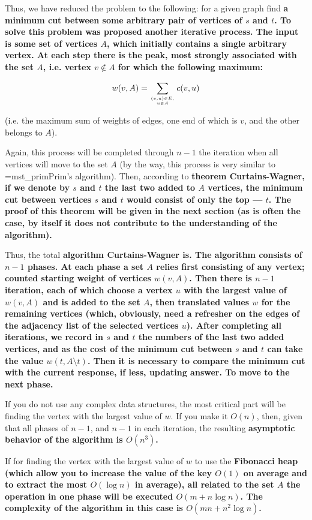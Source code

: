 Thus, we have reduced the problem to the following: for a given graph find \bf{a minimum cut between some arbitrary pair of vertices} of $s$ and $t$. To solve this problem was proposed another iterative process. The input is some set of vertices $A$, which initially contains a single arbitrary vertex. At each step there is the peak, \bf{most strongly associated} with the set $A$, i.e. vertex $v \not\in A$ for which the following maximum:

$$ w(v,A) = \sum_{(v,u) \in E, \atop u \in A} c(v,u) $$

(i.e. the maximum sum of weights of edges, one end of which is $v$, and the other belongs to $A$).

Again, this process will be completed through $n-1$ the iteration when all vertices will move to the set $A$ (by the way, this process is very similar to \algohref=mst_prim{Prim's algorithm}). Then, according to \bf{theorem Curtains-Wagner}, if we denote by $s$ and $t$ the last two added to $A$ vertices, the minimum cut between vertices $s$ and $t$ would consist of only the top --- $t$. The proof of this theorem will be given in the next section (as is often the case, by itself it does not contribute to the understanding of the algorithm).

Thus, the total \bf{algorithm} Curtains-Wagner is. The algorithm consists of $n-1$ phases. At each phase a set $A$ relies first consisting of any vertex; counted starting weight of vertices $w(v,A)$. Then there is $n-1$ iteration, each of which choose a vertex $u$ with the largest value of $w(v,A)$ and is added to the set $A$, then translated values $w$ for the remaining vertices (which, obviously, need a refresher on the edges of the adjacency list of the selected vertices $u$). After completing all iterations, we record in $s$ and $t$ the numbers of the last two added vertices, and as the cost of the minimum cut between $s$ and $t$ can take the value $w(t,A \setminus t)$. Then it is necessary to compare the minimum cut with the current response, if less, updating answer. To move to the next phase.

If you do not use any complex data structures, the most critical part will be finding the vertex with the largest value of $w$. If you make it $O(n)$, then, given that all phases of $n-1$, and $n-1$ in each iteration, the resulting \bf{asymptotic behavior of the algorithm} is $O(n^3)$.

If for finding the vertex with the largest value of $w$ to use the \bf{Fibonacci heap} (which allow you to increase the value of the key $O(1)$ on average and to extract the most $O(\log n)$ in average), all related to the set $A$ the operation in one phase will be executed $O(m + n \log n)$. The complexity of the algorithm in this case is $O(m n + n^2 \log n)$.


